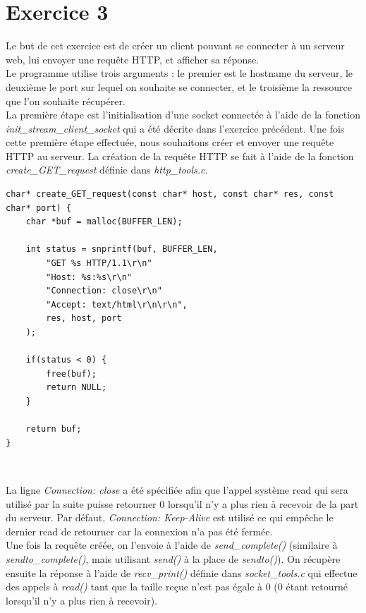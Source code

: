 \section{Exercice 3}
Le but de cet exercice est de créer un client pouvant se connecter à un serveur web, lui envoyer une requête HTTP, et afficher sa réponse.\\

Le programme utilise trois arguments : le premier est le hostname du serveur, le deuxième le port sur lequel on souhaite se connecter, et le troisième la ressource que l'on souhaite récupérer.\\

La première étape est l'initialisation d'une socket connectée à l'aide de la fonction \emph{init\_stream\_client\_socket} qui a été décrite dans l'exercice précédent. Une fois cette première étape effectuée, nous souhaitons créer et envoyer une requête HTTP au serveur. La création de la requête HTTP se fait à l'aide de la fonction \emph{create\_GET\_request} définie dans \emph{http\_tools.c}.\\

\begin{lstlisting}
char* create_GET_request(const char* host, const char* res, const char* port) {
    char *buf = malloc(BUFFER_LEN);

    int status = snprintf(buf, BUFFER_LEN,
        "GET %s HTTP/1.1\r\n"
        "Host: %s:%s\r\n"
        "Connection: close\r\n"
        "Accept: text/html\r\n\r\n",
        res, host, port
    );

    if(status < 0) {
        free(buf);
        return NULL;
    }

    return buf;
}
\end{lstlisting}
\

La ligne \emph{Connection: close} a été spécifiée afin que l'appel système read qui sera utilisé par la suite puisse retourner 0 lorsqu'il n'y a plus rien à recevoir de la part du serveur. Par défaut, \emph{Connection: Keep-Alive} est utilisé ce qui empêche le dernier read de retourner car la connexion n'a pas été fermée.\\

Une fois la requête créée, on l'envoie à l'aide de \emph{send\_complete()} (similaire à \emph{sendto\_complete()}, mais utilisant \emph{send()} à la place de \emph{sendto()}). On récupère ensuite la réponse à l'aide de \emph{recv\_print()} définie dans \emph{socket\_tools.c} qui effectue des appels à \emph{read()} tant que la taille reçue n'est pas égale à 0 (0 étant retourné lorsqu'il n'y a plus rien à recevoir).\\

